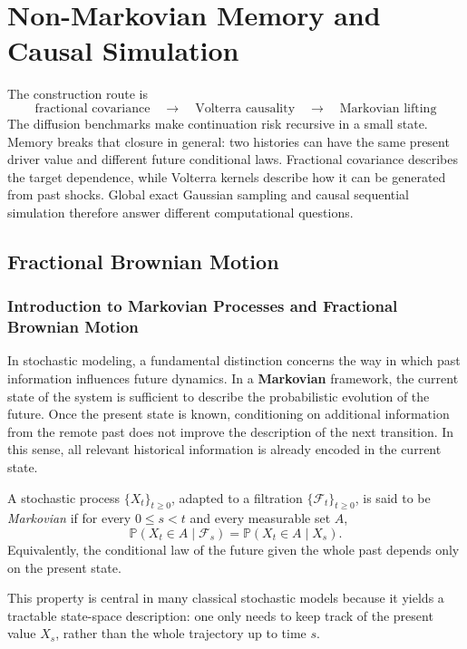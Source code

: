 \chapter{Non-Markovian Memory and Causal Simulation}\label{ch:memory}
The construction route is
\[
\text{fractional covariance}\quad\longrightarrow\quad\text{Volterra causality}\quad\longrightarrow\quad\text{Markovian lifting}
\]
The diffusion benchmarks make continuation risk recursive in a small state. Memory breaks that closure in general: two histories can have the same present driver value and different future conditional laws. Fractional covariance describes the target dependence, while Volterra kernels describe how it can be generated from past shocks. Global exact Gaussian sampling and causal sequential simulation therefore answer different computational questions.
\section{Fractional Brownian Motion}


\subsection{Introduction to Markovian Processes and Fractional Brownian Motion}

In stochastic modeling, a fundamental distinction concerns the way in which past information influences future dynamics. In a \textbf{Markovian} framework, the current state of the system is sufficient to describe the probabilistic evolution of the future. Once the present state is known, conditioning on additional information from the remote past does not improve the description of the next transition. In this sense, all relevant historical information is already encoded in the current state.

\begin{definition}
A stochastic process \(\{X_t\}_{t\ge 0}\), adapted to a filtration \(\{\mathcal{F}_t\}_{t\ge 0}\), is said to be \emph{Markovian} if for every \(0\le s<t\) and every measurable set \(A\),
\[
\mathbb{P}(X_t\in A\mid \mathcal{F}_s)
=
\mathbb{P}(X_t\in A\mid X_s).
\]
Equivalently, the conditional law of the future given the whole past depends only on the present state.
\end{definition}

This property is central in many classical stochastic models because it yields a tractable state-space description: one only needs to keep track of the present value \(X_s\), rather than the whole trajectory up to time \(s\).

